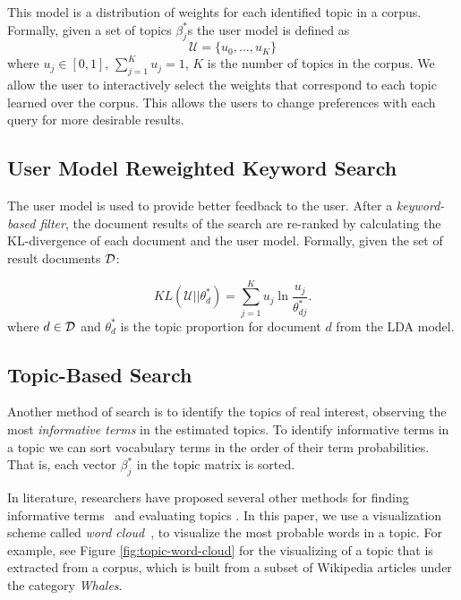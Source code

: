 This model is a distribution of weights for each identified topic in 
a corpus. Formally, given a set of topics $\beta_j^{*}$s the user 
model is defined as
$$
\mathcal{U} = \{u_0, \ldots, u_{K}\}
$$
where $u_j \in [0,1]$, $\sum_{j = 1}^K u_j = 1$, $K$ is the number 
of topics in the corpus.
We allow the user to interactively select the weights that correspond to
each topic learned over the corpus. This allows the users to change preferences with each query
for more desirable results.

\subsection{User Model Reweighted Keyword Search}
The user model is used to provide better feedback to
the user. After a \textsl{keyword-based filter}, the document results of the search 
are re-ranked by calculating the KL-divergence of each document and the
user model. Formally, given the set of result documents $\cal D$:

\begin{equation} \label{eq:KL}
KL(\mathcal{U}||\theta^*_{d}) = \sum_{j = 1}^K u_j \ln \frac{u_j}{\theta^*_{dj}}.
\end{equation}
where $d \in {\cal D}$ and $\theta^*_{d}$ is the topic proportion 
for document $d$ from the LDA model. 


\subsection{Topic-Based Search}

Another method of search is to identify the topics of 
real interest, observing the most \textsl{informative terms} in 
the estimated topics. 
To identify informative terms in a topic we can sort vocabulary 
terms in the order of their term probabilities.
That is, each vector $\beta_j^{*}$ in the topic matrix is sorted.
  
In literature, researchers have proposed several other methods for 
finding informative terms~\cite{2012-termite} and evaluating topics 
\cite{mimno2011optimizing}. In this paper, we use a visualization 
scheme called \textsl{word cloud}~\cite{Davis2013}, to visualize the 
most probable words in a topic. For example, see Figure 
\ref{fig:topic-word-cloud} for the visualizing of a topic that is 
extracted from a corpus, which is built from a subset of Wikipedia 
articles under the category \textsl{Whales}. 
       
